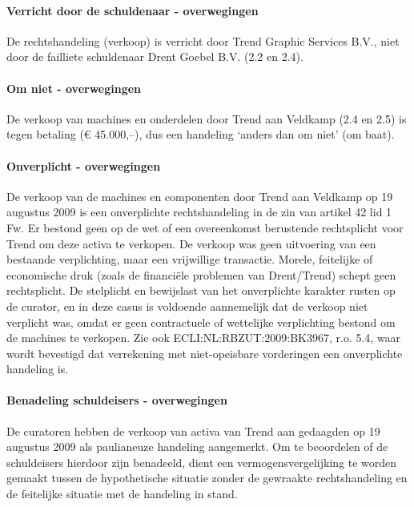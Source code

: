 \documentclass[
  dutch,
  a4paper,
]{article}
\begin{document}
\paragraph{Verricht door de schuldenaar - overwegingen}\label{verricht-door-de-schuldenaar---overwegingen-66}

De rechtshandeling (verkoop) is verricht door Trend Graphic Services B.V., niet door de failliete schuldenaar Drent Goebel B.V. (2.2 en 2.4).

\paragraph{Om niet - overwegingen}\label{om-niet---overwegingen-66}

De verkoop van machines en onderdelen door Trend aan Veldkamp (2.4 en 2.5) is tegen betaling (€ 45.000,--), dus een handeling `anders dan om niet' (om baat).

\paragraph{Onverplicht - overwegingen}\label{onverplicht---overwegingen-66}

De verkoop van de machines en componenten door Trend aan Veldkamp op 19 augustus 2009 is een onverplichte rechtshandeling in de zin van artikel 42 lid 1 Fw. Er bestond geen op de wet of een overeenkomst berustende rechtsplicht voor Trend om deze activa te verkopen. De verkoop was geen uitvoering van een bestaande verplichting, maar een vrijwillige transactie. Morele, feitelijke of economische druk (zoals de financiële problemen van Drent/Trend) schept geen rechtsplicht. De stelplicht en bewijslast van het onverplichte karakter rusten op de curator, en in deze casus is voldoende aannemelijk dat de verkoop niet verplicht was, omdat er geen contractuele of wettelijke verplichting bestond om de machines te verkopen. Zie ook ECLI:NL:RBZUT:2009:BK3967, r.o. 5.4, waar wordt bevestigd dat verrekening met niet-opeisbare vorderingen een onverplichte handeling is.

\paragraph{Benadeling schuldeisers - overwegingen}\label{benadeling-schuldeisers---overwegingen-66}

De curatoren hebben de verkoop van activa van Trend aan gedaagden op 19 augustus 2009 als paulianeuze handeling aangemerkt. Om te beoordelen of de schuldeisers hierdoor zijn benadeeld, dient een vermogensvergelijking te worden gemaakt tussen de hypothetische situatie zonder de gewraakte rechtshandeling en de feitelijke situatie met de handeling in stand.
\end{document}
